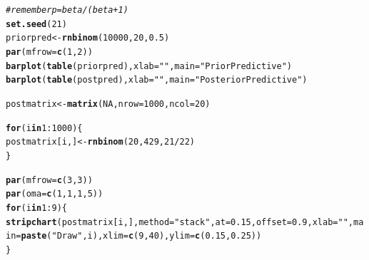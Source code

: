 \documentclass[12pt]{article}\usepackage[]{graphicx}\usepackage[]{color}
\makeatletter
\newcommand{\hlnum}[1]{\textcolor[rgb]{0.686,0.059,0.569}{#1}}%
\newcommand{\hlstr}[1]{\textcolor[rgb]{0.192,0.494,0.8}{#1}}%
\newcommand{\hlcom}[1]{\textcolor[rgb]{0.678,0.584,0.686}{\textit{#1}}}%
\newcommand{\hlopt}[1]{\textcolor[rgb]{0,0,0}{#1}}%
\newcommand{\hlstd}[1]{\textcolor[rgb]{0.345,0.345,0.345}{#1}}%
\newcommand{\hlkwa}[1]{\textcolor[rgb]{0.161,0.373,0.58}{\textbf{#1}}}%
\newcommand{\hlkwb}[1]{\textcolor[rgb]{0.69,0.353,0.396}{#1}}%
\newcommand{\hlkwc}[1]{\textcolor[rgb]{0.333,0.667,0.333}{#1}}%
\newcommand{\hlkwd}[1]{\textcolor[rgb]{0.737,0.353,0.396}{\textbf{#1}}}%
\newenvironment{kframe}{%
 \def\at@end@of@kframe{}%
 \ifinner\ifhmode%
  \def\at@end@of@kframe{\end{minipage}}%
  \begin{minipage}{\columnwidth}%
 \fi\fi%
 \def\FrameCommand##1{\hskip\@totalleftmargin \hskip-\fboxsep
 \colorbox{shadecolor}{##1}\hskip-\fboxsep
     \hskip-\linewidth \hskip-\@totalleftmargin \hskip\columnwidth}%
 \MakeFramed {\advance\hsize-\width
   \@totalleftmargin\z@ \linewidth\hsize
   \@setminipage}}%
 {\par\unskip\endMakeFramed%
 \at@end@of@kframe}
\newenvironment{knitrout}{}{} %
\makeatother
\begin{document}
\begin{knitrout}\footnotesize
{}\color{fgcolor}\begin{kframe}
\begin{alltt}
\hlcom{#remember p = beta/(beta+1)}
\hlkwd{set.seed}\hlstd{(}\hlnum{21}\hlstd{)}
\hlstd{priorpred} \hlkwb{<-} \hlkwd{rnbinom}\hlstd{(}\hlnum{10000}\hlstd{,} \hlnum{20}\hlstd{,} \hlnum{0.5}\hlstd{)}
\hlkwd{par}\hlstd{(}\hlkwc{mfrow}\hlstd{=}\hlkwd{c}\hlstd{(}\hlnum{1}\hlstd{,}\hlnum{2}\hlstd{))}
\hlkwd{barplot}\hlstd{(}\hlkwd{table}\hlstd{(priorpred),} \hlkwc{xlab}\hlstd{=}\hlstr{""}\hlstd{,} \hlkwc{main}\hlstd{=}\hlstr{"Prior Predictive"}\hlstd{)}
\hlkwd{barplot}\hlstd{(}\hlkwd{table}\hlstd{(postpred),} \hlkwc{xlab}\hlstd{=}\hlstr{""}\hlstd{,} \hlkwc{main}\hlstd{=}\hlstr{"Posterior Predictive"}\hlstd{)}
\end{alltt}
\end{kframe}
\end{knitrout}

\begin{knitrout}\footnotesize
{}\color{fgcolor}\begin{kframe}
\begin{alltt}
\hlstd{postmatrix} \hlkwb{<-} \hlkwd{matrix}\hlstd{(}\hlnum{NA}\hlstd{,} \hlkwc{nrow}\hlstd{=}\hlnum{1000}\hlstd{,} \hlkwc{ncol}\hlstd{=}\hlnum{20}\hlstd{)}

\hlkwa{for}\hlstd{(i} \hlkwa{in} \hlnum{1}\hlopt{:}\hlnum{1000}\hlstd{)\{}
  \hlstd{postmatrix[i,]} \hlkwb{<-} \hlkwd{rnbinom}\hlstd{(}\hlnum{20}\hlstd{,} \hlnum{429}\hlstd{,} \hlnum{21}\hlopt{/}\hlnum{22}\hlstd{)}
\hlstd{\}}

\hlkwd{par}\hlstd{(}\hlkwc{mfrow}\hlstd{=}\hlkwd{c}\hlstd{(}\hlnum{3}\hlstd{,}\hlnum{3}\hlstd{))}
\hlkwd{par}\hlstd{(}\hlkwc{oma}\hlstd{=}\hlkwd{c}\hlstd{(}\hlnum{1}\hlstd{,}\hlnum{1}\hlstd{,}\hlnum{1}\hlstd{,}\hlnum{5}\hlstd{))}
\hlkwa{for}\hlstd{(i} \hlkwa{in} \hlnum{1}\hlopt{:}\hlnum{9}\hlstd{)\{}
  \hlkwd{stripchart}\hlstd{(postmatrix[i,],} \hlkwc{method}\hlstd{=}\hlstr{"stack"}\hlstd{,} \hlkwc{at}\hlstd{=}\hlnum{0.15}\hlstd{,} \hlkwc{offset}\hlstd{=}\hlnum{0.9}\hlstd{,} \hlkwc{xlab}\hlstd{=}\hlstr{""}\hlstd{,} \hlkwc{main}\hlstd{=}\hlkwd{paste}\hlstd{(}\hlstr{"Draw"}\hlstd{, i),} \hlkwc{xlim}\hlstd{=}\hlkwd{c}\hlstd{(}\hlnum{9}\hlstd{,} \hlnum{40}\hlstd{),} \hlkwc{ylim}\hlstd{=}\hlkwd{c}\hlstd{(}\hlnum{0.15}\hlstd{,} \hlnum{0.25}\hlstd{))}
\hlstd{\}}
\end{alltt}
\end{kframe}
\end{knitrout}
\end{document}
